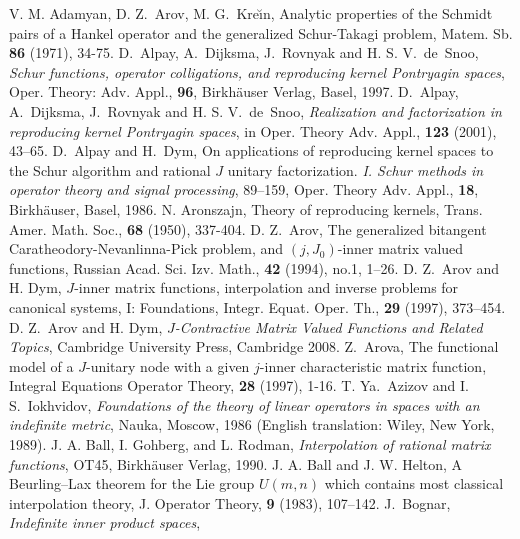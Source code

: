 \documentclass[12pt,twoside,a4paper]{amsart}
\theoremstyle{definition}
\numberwithin{equation}{section}
\begin{document}
\begin{thebibliography}{ArovD97}
        V. M. Adamyan, D. Z.~Arov,  M. G.~Kre\u{\i}n, Analytic
        properties of the Schmidt pairs of a Hankel operator and the
generalized Schur-Takagi problem,
        Matem. Sb. {\bf 86} (1971), 34-75.
        D.~Alpay, A.~Dijksma, J.~Rovnyak and H. S. V.~de~Snoo,
        \textit{ Schur functions, operator colligations, and reproducing kernel
        Pontryagin spaces}, Oper. Theory: Adv. Appl., {\bf 96},
        Birkh\"auser Verlag, Basel, 1997.
        D.~Alpay, A.~Dijksma, J.~Rovnyak and H. S. V.~de~Snoo,
        \textit{Realization and factorization in reproducing kernel
Pontryagin spaces}, in Oper. Theory Adv. Appl., {\bf 123} (2001), 43--65.
D.~Alpay and H.~Dym, On applications of reproducing kernel spaces to the
Schur algorithm
and rational $J$ unitary factorization.
\textit{ I. Schur methods in operator theory and
signal processing}, 89--159, Oper. Theory Adv. Appl., {\bf 18},
Birkh\"auser, Basel, 1986.
    N. Aronszajn,
    Theory of reproducing kernels, Trans. Amer. Math. Soc., {\bf 68} (1950),
    337-404.
    D. Z.~Arov, The generalized bitangent Caratheodory-Nevanlinna-Pick
    problem, and $(j,J_0)$-inner matrix valued functions, Russian
    Acad. Sci. Izv. Math., {\bf 42} (1994), no.1, 1--26.
    D. Z.~Arov and H. Dym, $J$-inner matrix functions, interpolation
    and inverse problems for canonical systems, I: Foundations,
Integr. Equat. Oper. Th., {\bf 29} (1997), 373--454.
    D. Z.~Arov and H. Dym, \textit{ $J$-Contractive Matrix Valued Functions and
Related Topics}, Cambridge University Press, Cambridge 2008.
    Z.~Arova,
    The functional model of a  $J$-unitary node with a given $j$-inner characteristic matrix function,
    Integral Equations Operator Theory, {\bf 28} (1997), 1-16.
        T. Ya.~Azizov and I. S.~Iokhvidov,
        \textit{Foundations of the theory of linear operators
        in spaces with an indefinite metric},
        Nauka, Moscow, 1986 (English translation:
        Wiley, New York, 1989).
    J. A. Ball, I. Gohberg, and L. Rodman, \textit{Interpolation of rational
    matrix functions}, OT45, Birkh\"auser Verlag, 1990.
    J. A. Ball and J. W. Helton,
    A Beurling--Lax theorem for the Lie group $U(m,n)$
    which contains most classical interpolation theory,
    J. Operator Theory, {\bf 9} (1983), 107--142.
        J.~Bognar,
        \textit{Indefinite inner product spaces},

\end{thebibliography}
\end{document}
